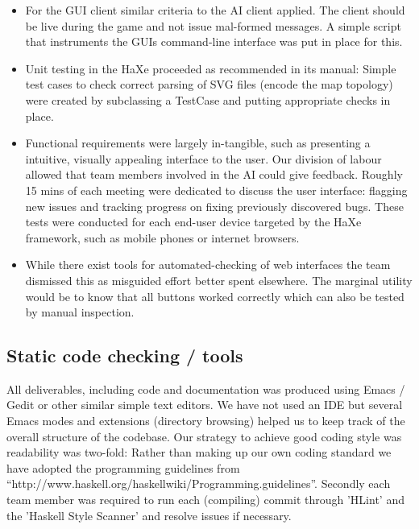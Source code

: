 \documentclass[pdftex,11pt,a4paper]{report}
\begin{document}
\begin{itemize}

\item For the GUI client similar criteria to the AI client
  applied. The client should be live during the game and not issue
  mal-formed messages. A simple script that instruments the GUIs
  command-line interface was put in place for this.

\item Unit testing in the HaXe proceeded as recommended in its manual:
  Simple test cases to check correct parsing of SVG files (encode the
  map topology) were created by subclassing a TestCase and putting
  appropriate checks in place.

\item Functional requirements were largely in-tangible, such as
  presenting a intuitive, visually appealing interface to the
  user. Our division of labour allowed that team members involved in
  the AI could give feedback.  Roughly 15 mins of each meeting were
  dedicated to discuss the user interface: flagging new issues and
  tracking progress on fixing previously discovered bugs. These tests
  were conducted for each end-user device targeted by the HaXe
  framework, such as mobile phones or internet browsers.

\item While there exist tools for automated-checking of web interfaces
  the team dismissed this as misguided effort better spent elsewhere.
  The marginal utility would be to know that all buttons worked
  correctly which can also be tested by manual inspection.

\end{itemize}

\subsection{Static code checking / tools}
All deliverables, including code and documentation was produced using
Emacs / Gedit or other similar simple text editors. We have not used
an IDE but several Emacs modes and extensions (directory browsing)
helped us to keep track of the overall structure of the codebase. Our
strategy to achieve good coding style was readability was two-fold:
Rather than making up our own coding standard we have adopted the
programming guidelines from
``http://www.haskell.org/haskellwiki/Programming.guidelines''. Secondly
each team member was required to run each (compiling) commit through
'HLint' and the 'Haskell Style Scanner' and resolve issues if
necessary.
\end{document}
